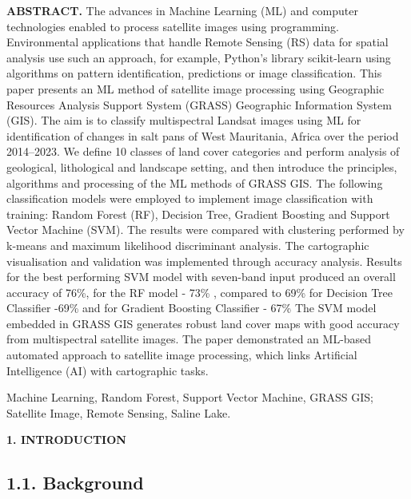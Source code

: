 \documentclass[12pt,a4paper,oneside]{article}
\def \newsection{\vspace{12pt}\textbf}
\def \newpar{\vspace{6pt}}
\begin{document}
{\bf ABSTRACT.} The advances in Machine Learning (ML) and computer technologies enabled to process satellite images using programming. Environmental applications that handle Remote Sensing (RS) data for spatial analysis use such an approach, for example, Python’s library scikit-learn using algorithms on pattern identification, predictions or image classification. This paper presents an ML method of satellite image processing using Geographic Resources Analysis Support System (GRASS) Geographic Information System (GIS). The aim is to classify multispectral Landsat images using ML for identification of changes in salt pans of West Mauritania, Africa over the period 2014–2023. We define 10 classes of land cover categories and perform analysis of geological, lithological and landscape setting, and then introduce the principles, algorithms and processing of the ML methods of GRASS GIS. The following classification models were employed to implement image classification with training: Random Forest (RF), Decision Tree, Gradient Boosting and Support Vector Machine (SVM). The results were compared with clustering performed by k-means and maximum likelihood discriminant analysis. The cartographic visualisation and validation was implemented through accuracy analysis. Results for the best performing SVM model with seven-band input produced an overall accuracy of 76\%, for the RF model - 73\% , compared to 69\% for Decision Tree Classifier -69\% and for Gradient Boosting Classifier - 67\% The SVM model embedded in GRASS GIS generates robust land cover maps with good accuracy from multispectral satellite images. The paper demonstrated an ML-based automated approach to satellite image processing, which links Artificial Intelligence (AI) with cartographic tasks.

\newpar {\bf Keywords:} Machine Learning, Random Forest, Support Vector Machine, GRASS GIS; Satellite Image, Remote Sensing, Saline Lake.

\newsection {1. INTRODUCTION}

\subsection*{1.1. Background}
\end{document}
